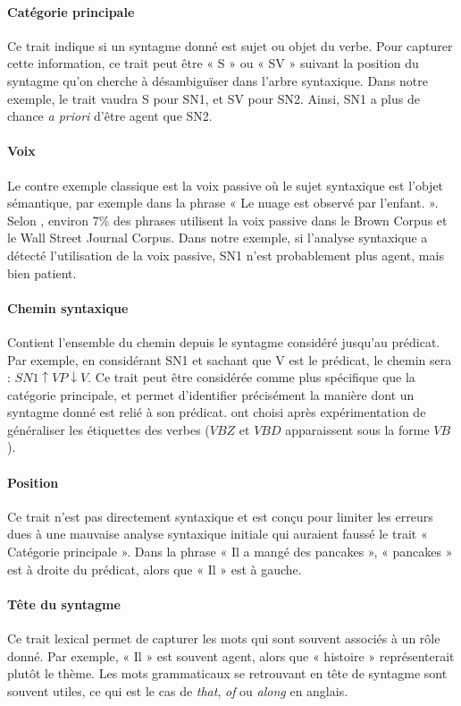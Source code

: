 \paragraph{Catégorie principale} Ce trait indique si un syntagme donné est
sujet ou objet du verbe. Pour capturer cette information, ce trait peut être «
S » ou « SV » suivant la position du syntagme qu'on cherche à désambiguïser
dans l'arbre syntaxique. Dans notre exemple, le trait vaudra S pour SN1, et SV
pour SN2. Ainsi, SN1 a plus de chance \textit{a priori} d'être agent que SN2.

\paragraph{Voix} Le contre exemple classique est la voix passive où le sujet
syntaxique est l'objet sémantique, par exemple dans la phrase « Le nuage est
observé par l'enfant. ». Selon \cite{roland2002verb}, environ 7\% des phrases
utilisent la voix passive dans le Brown Corpus et le Wall Street Journal
Corpus. Dans notre exemple, si l'analyse syntaxique a détecté l'utilisation de
la voix passive, SN1 n'est probablement plus agent, mais bien patient.

\paragraph{Chemin syntaxique} Contient l'ensemble du chemin depuis le syntagme
considéré jusqu'au prédicat. Par exemple, en considérant SN1 et sachant que V
est le prédicat, le chemin sera : $SN1 \uparrow VP \downarrow V$. Ce trait peut
être considérée comme plus spécifique que la catégorie principale, et permet
d'identifier précisément la manière dont un syntagme donné est relié à son
prédicat. \cite{gildea2002automatic} ont choisi après expérimentation de
généraliser les étiquettes des verbes ($VBZ$ et $VBD$ apparaissent sous la
forme $VB$).

\paragraph{Position} Ce trait n'est pas directement syntaxique et est conçu
pour limiter les erreurs dues à une mauvaise analyse syntaxique initiale qui
auraient faussé le trait « Catégorie principale ». Dans la phrase « Il a mangé
des pancakes », « pancakes » est à droite du prédicat, alors que « Il » est à
gauche.

\paragraph{Tête du syntagme} Ce trait lexical permet de capturer les mots qui
sont souvent associés à un rôle donné. Par exemple, « Il » est souvent agent,
alors que « histoire » représenterait plutôt le thème. Les mots grammaticaux se
retrouvant en tête de syntagme sont souvent utiles, ce qui est le cas de
\textit{that}, \textit{of} ou \textit{along} en anglais.

